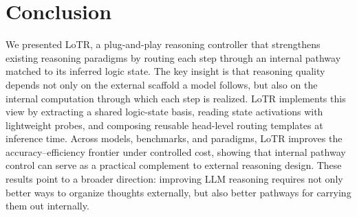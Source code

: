 \section{Conclusion}
\label{sec:conclusion}
\vspace{-1mm}

We presented LoTR, a plug-and-play reasoning controller that strengthens existing reasoning paradigms by routing each step through an internal pathway matched to its inferred logic state. The key insight is that reasoning quality depends not only on the external scaffold a model follows, but also on the internal computation through which each step is realized. LoTR implements this view by extracting a shared logic-state basis, reading state activations with lightweight probes, and composing reusable head-level routing templates at inference time. Across models, benchmarks, and paradigms, LoTR improves the accuracy--efficiency frontier under controlled cost, showing that internal pathway control can serve as a practical complement to external reasoning design. These results point to a broader direction: improving LLM reasoning requires not only better ways to organize thoughts externally, but also better pathways for carrying them out internally.